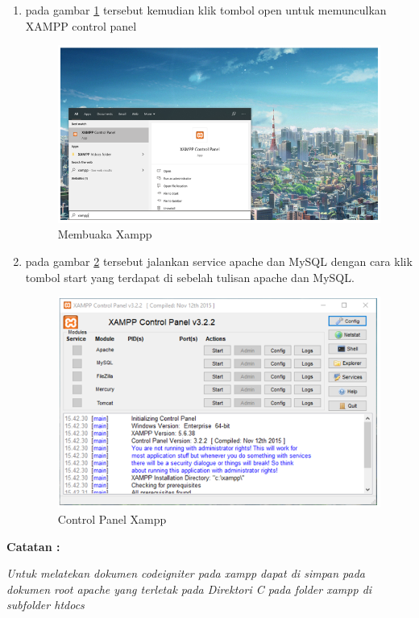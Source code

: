 \begin{enumerate}
\item pada gambar \ref{x9} tersebut kemudian klik tombol open untuk memunculkan XAMPP control panel
\begin{figure}[!htbp]
	\centerline{\includegraphics[width=1\textwidth]{figures/xampp/8.png}}
	\caption{Membuaka Xampp}
	\label{x9}
\end{figure}

\item pada gambar \ref{x10} tersebut jalankan service apache dan MySQL dengan cara klik tombol start yang terdapat di sebelah tulisan apache dan MySQL.
\begin{figure}[!htbp]
	\centerline{\includegraphics[width=1\textwidth]{figures/xampp/9.png}}
	\caption{Control Panel Xampp}
	\label{x10}
\end{figure}
\end{enumerate}
\textbf{Catatan :}\par
\textit{Untuk melatekan dokumen codeigniter pada xampp dapat di simpan pada dokumen root apache yang terletak pada Direktori C pada folder xampp di subfolder htdocs }\pagebreak


